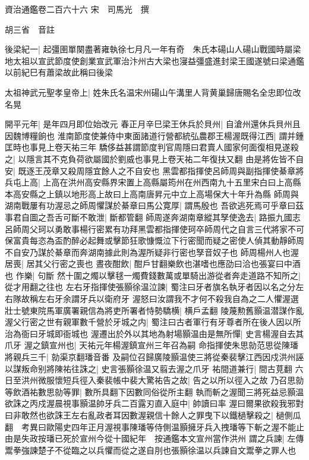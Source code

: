 資治通鑑卷二百六十六
宋　司馬光　撰

胡三省　音註

後梁紀一|{
	起彊圉單闋盡著雍執徐七月凡一年有奇　朱氏本碭山人碭山戰國時屬梁地太祖以宣武節度使創業宣武軍治汴州古大梁也寖益彊盛進封梁王國遂號曰梁通鑑以前紀巳有蕭梁故此稱曰後梁}


太祖神武元聖孝皇帝上|{
	姓朱氏名温宋州碭山午溝里人背黄巢歸唐賜名全忠即位改名晃}


開平元年|{
	是年四月即位始改元}
春正月辛巳梁王休兵於貝州|{
	自滄州還休兵貝州且因魏博糧餉也}
淮南節度使兼侍中東面諸道行營都統弘農郡王楊渥既得江西|{
	謂并鍾匡時也事見上卷天祐三年}
驕侈益甚謂節度判官周隱曰君賣人國家何面復相見遂殺之|{
	以隱言其不克負荷欲屬國於劉威也事見上卷天祐二年復扶又翻}
由是將佐皆不自安|{
	既逐王茂章又殺周隱宜餘人之不自安也}
黑雲都指揮使呂師周與副指揮使綦章將兵屯上高|{
	上高在洪州高安縣界宋置上高縣屬筠州在州西南九十五里宋白曰上高縣本高安縣之上鎮以地形高上故曰上高南唐昇元中立上高場保大十年升為縣}
師周與湖南戰屢有功渥忌之師周懼謀於綦章曰馬公寛厚|{
	謂馬殷也}
吾欲逃死焉可乎章曰茲事君自圖之吾舌可斷不敢泄|{
	斷都管翻}
師周遂奔湖南章縱其孥使逸去|{
	路振九國志呂師周父珂以勇敢事楊行密累有功拜黑雲都指揮使珂卒師周代之自言三代將家不可保富貴每恣為盃酌醉必起舞或擊節狂歌慷慨泣下行密聞而疑之密使人偵其動靜師周不自安乃謀於綦章而奔湖南據此則為渥所疑非行密也孥音奴子也}
師周楊州人也渥居喪|{
	居其父行密之喪也}
晝夜酣飲|{
	酣戶甘翻樂飲也湛嗜也應劭曰洽也張宴曰中酒也}
作樂|{
	句斷}
然十圍之燭以擊毬一燭費錢數萬或單騎出游從者奔走道路不知所之|{
	從才用翻之往也}
左右牙指揮使張顥徐温泣諫|{
	蜀注曰牙者旗名執牙者因以名之分左右隊故稱左右牙余謂牙兵以衛府牙}
渥怒曰汝謂我不才何不殺我自為之二人懼渥選壯士號東院馬軍廣署親信為將吏所署者恃勢驕横|{
	横戶孟翻}
陵蔑勲舊顥温潜謀作亂渥父行密之世有親軍數千營於牙城之内|{
	蜀注曰古者軍行有牙尊者所在後人因以所治為衙曰牙城即衙城也}
渥遷出於外以其地為射場顥温由是無所憚|{
	史言楊渥自去其爪牙}
渥之鎮宣州也|{
	天祐元年楊渥鎮宣州三年召為嗣}
命指揮使朱思勍范思從陳璠將親兵三千|{
	勍渠京翻璠音番}
及嗣位召歸廣陵顥温使三將從秦裴擊江西因戍洪州誣以謀叛命别將陳祐往誅之|{
	史言張顥徐温又翦去渥之爪牙}
祐間道兼行|{
	間古莧翻}
六日至洪州微服懷短兵徑入秦裴帳中裴大驚祐告之故|{
	告之以所以徑入之故}
乃召思勍等飲酒祐數思勍等罪|{
	數所具翻下因數同俗從所主翻}
執而斬之渥聞三將死益忌顥温欲誅之丙戍渥晨視事顥温帥牙兵二百露刃直入庭中|{
	帥讀曰率}
渥曰爾果欲殺我邪對曰非敢然也欲誅王左右亂政者耳因數渥親信十餘人之罪曳下以鐵檛擊殺之|{
	檛側瓜翻　考異曰歐陽史四年正月渥視事陳璠等侍側温顥擁牙兵入拽璠等下斬之渥不能止由是失政按璠已死於宣州今從十國紀年　按通鑑本文宣州當作洪州}
謂之兵諫|{
	左傳鬻拳強諫楚子不從臨之以兵懼而從之遂自刖也張顥徐温以兵諫自文鬻拳之罪人也}
